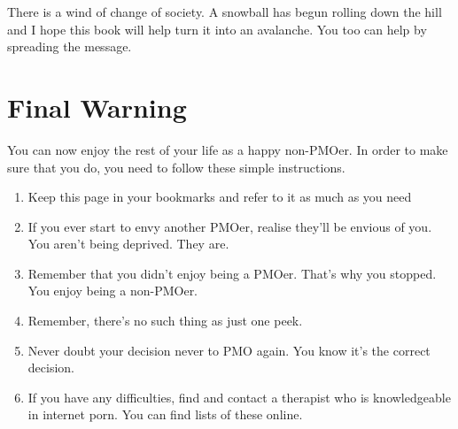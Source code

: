 \documentclass[easypeasy.tex]{subfiles}
\begin{document}
There is a wind of change of society. A snowball has begun rolling down the hill and I hope this book will help turn it into an avalanche. You too can help by spreading the message.

\section{Final Warning}

You can now enjoy the rest of your life as a happy non-PMOer. In order to make sure that you do, you need to follow these simple instructions.
\begin{enumerate}
  \item Keep this page in your bookmarks and refer to it as much as you need
  \item If you ever start to envy another PMOer, realise they'll be envious of you. You aren't being deprived. They are.
  \item Remember that you didn't enjoy being a PMOer. That's why you stopped. You enjoy being a non-PMOer.
  \item Remember, there's no such thing as just one peek.
  \item Never doubt your decision never to PMO again. You know it's the correct decision.
  \item If you have any difficulties, find and contact a therapist who is knowledgeable in internet porn. You can find lists of these online.
\end{enumerate}
\end{document}
